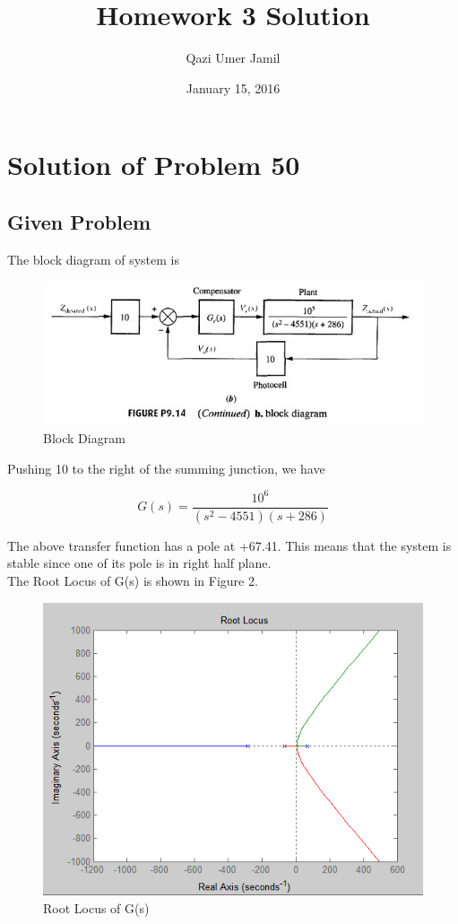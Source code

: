 \documentclass{article}
\title{Homework 3 Solution}
\author{Qazi Umer Jamil }
\date{January 15, 2016}
\begin{document}
\maketitle

\section{Solution of Problem 50}

\subsection{Given Problem}
The block diagram of system is

\begin{figure}[h]
  \includegraphics[width=\linewidth]{block_diagram.jpg}
  \caption{Block Diagram}
  \label{fig:boat1}
\end{figure}

Pushing 10 to the right of the summing junction, we have

\[ G(s)=\frac{10^6}{(s^2 - 4551)(s+286)} \]

The above transfer function has a pole at +67.41. This means that the system is stable since one of its pole is in right half plane.
\\
The Root Locus of G(s) is shown in Figure 2.
\begin{figure}[h]
  \includegraphics[width=\linewidth]{fig_1.PNG}
  \caption{Root Locus of G(s)}
  \label{fig:boat1}
\end{figure}
\end{document}
